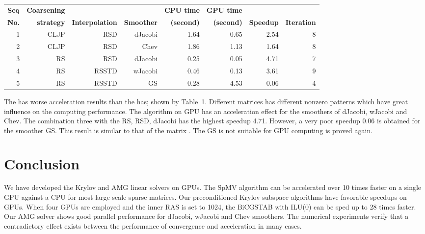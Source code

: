 \documentclass[runningheads,a4paper]{llncs}
\begin{document}
{\begin{table}
\begin{tabular}{|r|r|r|r|r|r|r|r|}
\bfseries Seq & \bfseries Coarsening & \bfseries               & \bfseries          & \bfseries CPU time & \bfseries GPU time & \bfseries         & \bfseries           \\
\bfseries No. & \bfseries strategy   & \bfseries Interpolation & \bfseries Smoother & \bfseries (second) & \bfseries (second) & \bfseries Speedup & \bfseries Iteration \\ \hline
1	          &CLJP	   &RSD	        &dJacobi	    &1.64	       &0.65	       &2.54	       &8\\ \hline
2	          &CLJP	   &RSD	        &Chev	        &1.86	       &1.13	       &1.64	       &8\\ \hline
3	          &RS	   &RSD	        &dJacobi	    &0.25	       &0.05	       &4.71	       &7\\ \hline
4	          &RS	   &RSSTD	    &wJacobi	    &0.46	       &0.13	       &3.61	       &9\\ \hline
5	          &RS	   &RSSTD	    &GS	            &0.28	       &4.53	       &0.06	       &4\\ \hline
\end{tabular}
\label{tbl_amg_3dpoisson}
\end{table}

The  has worse acceleration results than the  has; shown by Table~\ref{tbl_amg_3dpoisson}. Different matrices has different nonzero patterns which have great influence on the computing performance. The algorithm on GPU has an acceleration effect for the smoothers of dJacobi, wJacobi and Chev. The combination three with the RS, RSD, dJacobi has the highest speedup 4.71. However, a very poor speedup 0.06 is obtained for the smoother GS. This result is similar to that of the matrix . The GS is not suitable for GPU computing is proved again.

\section{Conclusion}
\label{sec_conclusion}

We have developed the Krylov and AMG linear solvers on GPUs. The SpMV algorithm can be accelerated over 10 times faster on a single GPU against a CPU for most large-scale sparse matrices. Our preconditioned Krylov subspace algorithms have favorable speedups on GPUs. When four GPUs are employed and the inner RAS is set to 1024, the BiCGSTAB with ILU(0) can be sped up to 28 times faster. Our AMG solver shows good parallel performance for dJacobi, wJacobi and Chev smoothers. The numerical experiments verify that a contradictory effect exists between the performance of convergence and acceleration in many cases.

}
\end{document}
